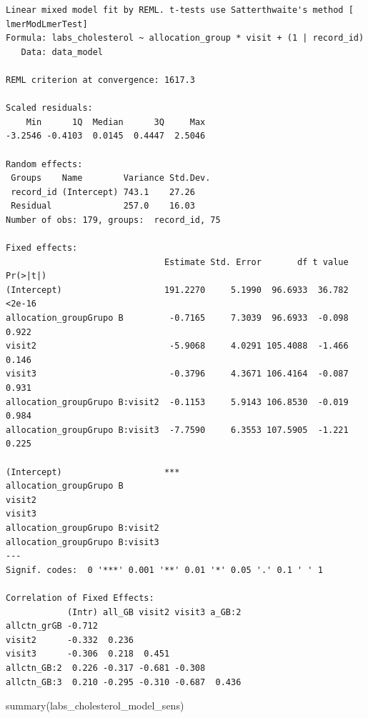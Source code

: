 \documentclass[
  letterpaper,
  DIV=11,
  numbers=noendperiod]{scrartcl}
\newenvironment{Shaded}{\begin{snugshade}}{\end{snugshade}}
\newcommand{\FunctionTok}[1]{\textcolor[rgb]{0.28,0.35,0.67}{#1}}
\newcommand{\NormalTok}[1]{\textcolor[rgb]{0.00,0.23,0.31}{#1}}
\begin{document}
\begin{verbatim}
Linear mixed model fit by REML. t-tests use Satterthwaite's method [
lmerModLmerTest]
Formula: labs_cholesterol ~ allocation_group * visit + (1 | record_id)
   Data: data_model

REML criterion at convergence: 1617.3

Scaled residuals: 
    Min      1Q  Median      3Q     Max 
-3.2546 -0.4103  0.0145  0.4447  2.5046 

Random effects:
 Groups    Name        Variance Std.Dev.
 record_id (Intercept) 743.1    27.26   
 Residual              257.0    16.03   
Number of obs: 179, groups:  record_id, 75

Fixed effects:
                               Estimate Std. Error       df t value Pr(>|t|)
(Intercept)                    191.2270     5.1990  96.6933  36.782   <2e-16
allocation_groupGrupo B         -0.7165     7.3039  96.6933  -0.098    0.922
visit2                          -5.9068     4.0291 105.4088  -1.466    0.146
visit3                          -0.3796     4.3671 106.4164  -0.087    0.931
allocation_groupGrupo B:visit2  -0.1153     5.9143 106.8530  -0.019    0.984
allocation_groupGrupo B:visit3  -7.7590     6.3553 107.5905  -1.221    0.225
                                  
(Intercept)                    ***
allocation_groupGrupo B           
visit2                            
visit3                            
allocation_groupGrupo B:visit2    
allocation_groupGrupo B:visit3    
---
Signif. codes:  0 '***' 0.001 '**' 0.01 '*' 0.05 '.' 0.1 ' ' 1

Correlation of Fixed Effects:
            (Intr) all_GB visit2 visit3 a_GB:2
allctn_grGB -0.712                            
visit2      -0.332  0.236                     
visit3      -0.306  0.218  0.451              
allctn_GB:2  0.226 -0.317 -0.681 -0.308       
allctn_GB:3  0.210 -0.295 -0.310 -0.687  0.436
\end{verbatim}

\begin{Shaded}
\begin{Highlighting}[]
\FunctionTok{summary}\NormalTok{(labs\_cholesterol\_model\_sens)}
\end{Highlighting}
\end{Shaded}
\end{document}
